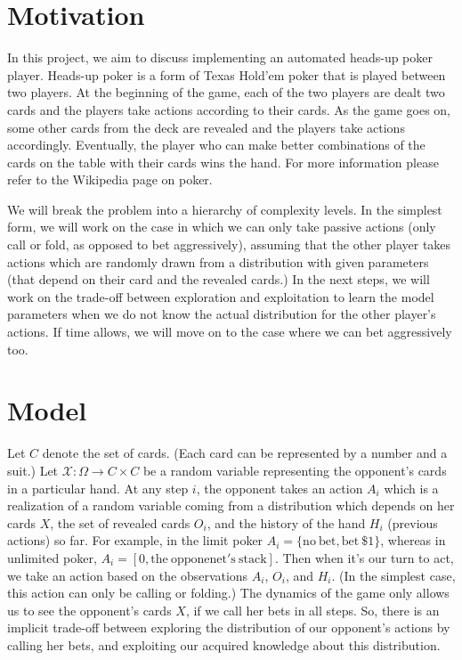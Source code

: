 \section{Motivation}\label{intro}
In this project, we aim to discuss implementing an automated heads-up poker 
player. Heads-up poker is a form of Texas Hold'em poker that is played 
between two players. At
the beginning of the game, each of the two players are dealt two cards and 
the players take actions according to their cards. As the game goes on, some
other cards from the deck are revealed and the players take actions 
accordingly. Eventually, the player who can make better combinations of
the cards on the table with their cards wins the hand. For more information
please refer to the Wikipedia page on poker.

We will break the problem into a hierarchy of complexity levels. In the simplest 
form, we will work on the case in which we can only take passive actions
(only call or fold, as opposed to bet aggressively), assuming that the other player takes actions
which are randomly drawn from a distribution with given parameters (that depend
on their card and the revealed cards.) In the next steps, we will work on the
trade-off between exploration and exploitation to learn the model parameters 
when we do not know the actual distribution for the other player's actions. 
If time allows, we will move on to the case where we can bet aggressively too.

\section{Model}
Let $C$ denote the set of cards. (Each card can be represented by a number
and a suit.) Let $\mathcal X:\Omega \rightarrow C\times C $ be a random variable 
representing the opponent's cards in a particular hand. At any step $i$,
the opponent takes an action $A_i$ which is a realization of a random variable
coming from a distribution
which depends on her cards $X$, the set of revealed cards $O_i$, and the 
history of the hand $H_i$ (previous actions) so far. For example, in the limit poker 
$A_i=\{\mathrm{no~bet},\mathrm{bet~\$1}\}$, whereas in unlimited poker,
$A_i=[0,\mathrm{the~opponenet's~stack}]$. Then when it's our turn to act, we take an 
action based on the observations $A_i$, $O_i$, and $H_i$. (In the simplest case, this 
action can only be calling or folding.) The dynamics of the game only allows
us to see the opponent's cards $X$, if we call her bets in all steps. So, there is
an implicit trade-off between exploring the distribution of our opponent's actions
by calling her bets, and exploiting our acquired knowledge about this distribution.

